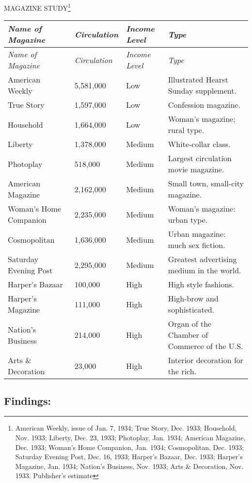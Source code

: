 \documentclass[nohyper,openany,nobib]{tufte-book}
\begin{document}
\vspace{5mm}

\begin{center}MAGAZINE STUDY\footnote{American Weekly, issue of Jan. 7, 1934; True Story, Dec. 1933;
  Household, Nov. 1933; Liberty, Dec. 23, 1933; Photoplay, Jan. 1934;
  American Magazine, Dec. 1933; Woman's Home Companion, Jan. 1934;
  Cosmopolitan, Dec. 1933; Saturday Evening Post, Dec. 16, 1933;
  Harper's Bazaar, Dec. 1933; Harper's Magazine, Jan. 1934; Nation's
  Business, Nov. 1933; Arts \& Decoration, Nov. 1933. Publisher's estimate}\end{center}
\tabulinesep=1.1mm
{\begin{longtabu} to 1.05\textwidth { X[2,l] X[1,r] X[1,l] X[3,l] } 
\emph{Name of Magazine} & \emph{Circulation} & \emph{Income Level} & \emph{Type} \\ [1.5ex]
\endfirsthead
\emph{Name of Magazine} & \emph{Circulation} & \emph{Income Level} & \emph{Type} \\ [1.5ex]
\endhead
American Weekly & 5,581,000 & Low & Illustrated Hearst Sunday supplement. \\
True Story & 1,597,000 & Low & Confession magazine. \\
Household & 1,664,000 & Low & Woman's magazine; rural type. \\
Liberty & 1,378,000 & Medium & White-collar class. \\
Photoplay & 518,000 & Medium & Largest circulation movie magazine. \\
American Magazine & 2,162,000 & Medium & Small town, small-city magazine. \\
Woman's Home Companion & 2,235,000 & Medium & Woman's magazine: urban type. \\
Cosmopolitan & 1,636,000 & Medium & Urban magazine: much sex fiction. \\
Saturday Evening Post & 2,295,000 & Medium & Greatest advertising medium in the world. \\
Harper's Bazaar & 100,000 & High & High style fashions. \\
Harper's Magazine & 111,000 & High & High-brow and sophisticated. \\
Nation's Business & 214,000 & High & Organ of the Chamber of Commerce of the U.S. \\
Arts \& Decoration & 23,000 & High & Interior decoration for the rich. \\
\end{longtabu}}


\subsection{Findings:}
\end{document}
